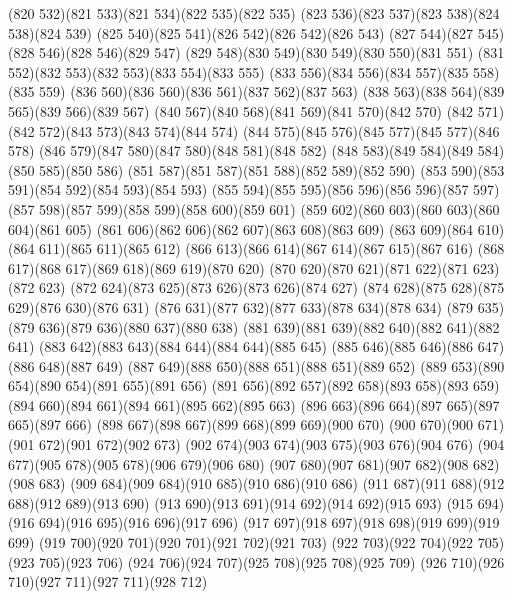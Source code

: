 \cpath (820 532)(821 533)(821 534)(822 535)(822 535)
\cpath (823 536)(823 537)(823 538)(824 538)(824 539)
\cpath (825 540)(825 541)(826 542)(826 542)(826 543)
\cpath (827 544)(827 545)(828 546)(828 546)(829 547)
\cpath (829 548)(830 549)(830 549)(830 550)(831 551)
\cpath (831 552)(832 553)(832 553)(833 554)(833 555)
\cpath (833 556)(834 556)(834 557)(835 558)(835 559)
\cpath (836 560)(836 560)(836 561)(837 562)(837 563)
\cpath (838 563)(838 564)(839 565)(839 566)(839 567)
\cpath (840 567)(840 568)(841 569)(841 570)(842 570)
\cpath (842 571)(842 572)(843 573)(843 574)(844 574)
\cpath (844 575)(845 576)(845 577)(845 577)(846 578)
\cpath (846 579)(847 580)(847 580)(848 581)(848 582)
\cpath (848 583)(849 584)(849 584)(850 585)(850 586)
\cpath (851 587)(851 587)(851 588)(852 589)(852 590)
\cpath (853 590)(853 591)(854 592)(854 593)(854 593)
\cpath (855 594)(855 595)(856 596)(856 596)(857 597)
\cpath (857 598)(857 599)(858 599)(858 600)(859 601)
\cpath (859 602)(860 603)(860 603)(860 604)(861 605)
\cpath (861 606)(862 606)(862 607)(863 608)(863 609)
\cpath (863 609)(864 610)(864 611)(865 611)(865 612)
\cpath (866 613)(866 614)(867 614)(867 615)(867 616)
\cpath (868 617)(868 617)(869 618)(869 619)(870 620)
\cpath (870 620)(870 621)(871 622)(871 623)(872 623)
\cpath (872 624)(873 625)(873 626)(873 626)(874 627)
\cpath (874 628)(875 628)(875 629)(876 630)(876 631)
\cpath (876 631)(877 632)(877 633)(878 634)(878 634)
\cpath (879 635)(879 636)(879 636)(880 637)(880 638)
\cpath (881 639)(881 639)(882 640)(882 641)(882 641)
\cpath (883 642)(883 643)(884 644)(884 644)(885 645)
\cpath (885 646)(885 646)(886 647)(886 648)(887 649)
\cpath (887 649)(888 650)(888 651)(888 651)(889 652)
\cpath (889 653)(890 654)(890 654)(891 655)(891 656)
\cpath (891 656)(892 657)(892 658)(893 658)(893 659)
\cpath (894 660)(894 661)(894 661)(895 662)(895 663)
\cpath (896 663)(896 664)(897 665)(897 665)(897 666)
\cpath (898 667)(898 667)(899 668)(899 669)(900 670)
\cpath (900 670)(900 671)(901 672)(901 672)(902 673)
\cpath (902 674)(903 674)(903 675)(903 676)(904 676)
\cpath (904 677)(905 678)(905 678)(906 679)(906 680)
\cpath (907 680)(907 681)(907 682)(908 682)(908 683)
\cpath (909 684)(909 684)(910 685)(910 686)(910 686)
\cpath (911 687)(911 688)(912 688)(912 689)(913 690)
\cpath (913 690)(913 691)(914 692)(914 692)(915 693)
\cpath (915 694)(916 694)(916 695)(916 696)(917 696)
\cpath (917 697)(918 697)(918 698)(919 699)(919 699)
\cpath (919 700)(920 701)(920 701)(921 702)(921 703)
\cpath (922 703)(922 704)(922 705)(923 705)(923 706)
\cpath (924 706)(924 707)(925 708)(925 708)(925 709)
\cpath (926 710)(926 710)(927 711)(927 711)(928 712)
